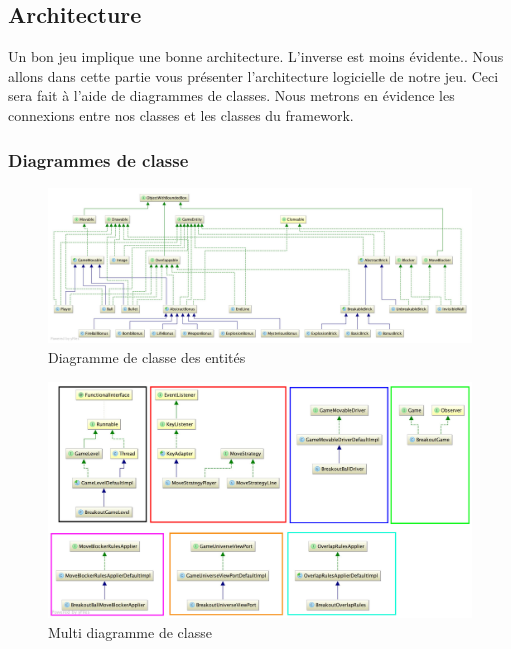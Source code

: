 \documentclass[a4paper,10pt]{article}
\begin{document}
\subsection{Architecture}
    Un bon jeu implique une bonne architecture. L'inverse est moins évidente..
	Nous allons dans cette partie vous présenter l'architecture logicielle de notre jeu. Ceci sera fait à l'aide de
	diagrammes de classes.
	Nous metrons en évidence les connexions entre nos classes et les classes du framework.

	\newpage
	\subsubsection{Diagrammes de classe}

		\FloatBarrier
		\begin{figure}[!h]
    		\begin{center}
	  	  	\includegraphics[scale=0.175]{images/whiteEntityDiagram.jpg}
          	\caption{Diagramme de classe des entités}
    		\end{center}
		\end{figure}
		\FloatBarrier
		
		
 		\FloatBarrier
 		\begin{figure}[!h]
     		\begin{center}
 	  	  	\includegraphics[scale=0.2]{images/whiteSeveralDiagram.jpg}
           	\caption{Multi diagramme de classe}
     		\end{center}
 		\end{figure}
 		\FloatBarrier
\end{document}
